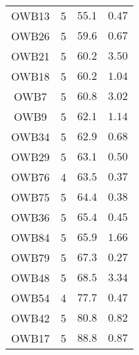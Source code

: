 \begin{longtable}{crrr}
OWB13 & 5 & $55.1$ & $0.47$ \\ 
OWB26 & 5 & $59.6$ & $0.67$ \\ 
OWB21 & 5 & $60.2$ & $3.50$ \\ 
OWB18 & 5 & $60.2$ & $1.04$ \\ 
OWB7 & 5 & $60.8$ & $3.02$ \\ 
OWB9 & 5 & $62.1$ & $1.14$ \\ 
OWB34 & 5 & $62.9$ & $0.68$ \\ 
OWB29 & 5 & $63.1$ & $0.50$ \\ 
OWB76 & 4 & $63.5$ & $0.37$ \\ 
OWB75 & 5 & $64.4$ & $0.38$ \\ 
OWB36 & 5 & $65.4$ & $0.45$ \\ 
OWB84 & 5 & $65.9$ & $1.66$ \\ 
OWB79 & 5 & $67.3$ & $0.27$ \\ 
OWB48 & 5 & $68.5$ & $3.34$ \\ 
OWB54 & 4 & $77.7$ & $0.47$ \\ 
OWB42 & 5 & $80.8$ & $0.82$ \\ 
OWB17 & 5 & $88.8$ & $0.87$ \\ 
\bottomrule
\end{longtable}

